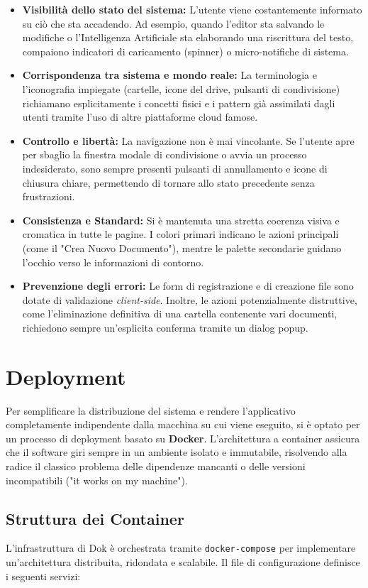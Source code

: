 \documentclass[11pt,a4paper]{report}
\begin{document}
\begin{itemize}
    \item \textbf{Visibilità dello stato del sistema:} L'utente viene costantemente informato su ciò che sta accadendo. Ad esempio, quando l'editor sta salvando le modifiche o l'Intelligenza Artificiale sta elaborando una riscrittura del testo, compaiono indicatori di caricamento (spinner) o micro-notifiche di sistema.
    \item \textbf{Corrispondenza tra sistema e mondo reale:} La terminologia e l'iconografia impiegate (cartelle, icone del drive, pulsanti di condivisione) richiamano esplicitamente i concetti fisici e i pattern già assimilati dagli utenti tramite l'uso di altre piattaforme cloud famose.
    \item \textbf{Controllo e libertà:} La navigazione non è mai vincolante. Se l'utente apre per sbaglio la finestra modale di condivisione o avvia un processo indesiderato, sono sempre presenti pulsanti di annullamento e icone di chiusura chiare, permettendo di tornare allo stato precedente senza frustrazioni.
    \item \textbf{Consistenza e Standard:} Si è mantenuta una stretta coerenza visiva e cromatica in tutte le pagine. I colori primari indicano le azioni principali (come il "Crea Nuovo Documento"), mentre le palette secondarie guidano l'occhio verso le informazioni di contorno.
    \item \textbf{Prevenzione degli errori:} Le form di registrazione e di creazione file sono dotate di validazione \textit{client-side}. Inoltre, le azioni potenzialmente distruttive, come l'eliminazione definitiva di una cartella contenente vari documenti, richiedono sempre un'esplicita conferma tramite un dialog popup.
\end{itemize}


\chapter{Deployment}

Per semplificare la distribuzione del sistema e rendere l'applicativo completamente indipendente dalla macchina su cui viene eseguito, si è optato per un processo di deployment basato su \textbf{Docker}. L'architettura a container assicura che il software giri sempre in un ambiente isolato e immutabile, risolvendo alla radice il classico problema delle dipendenze mancanti o delle versioni incompatibili ("it works on my machine").

\section{Struttura dei Container}
L'infrastruttura di Dok è orchestrata tramite \texttt{docker-compose} per implementare un'architettura distribuita, ridondata e scalabile. Il file di configurazione definisce i seguenti servizi:
\end{document}
